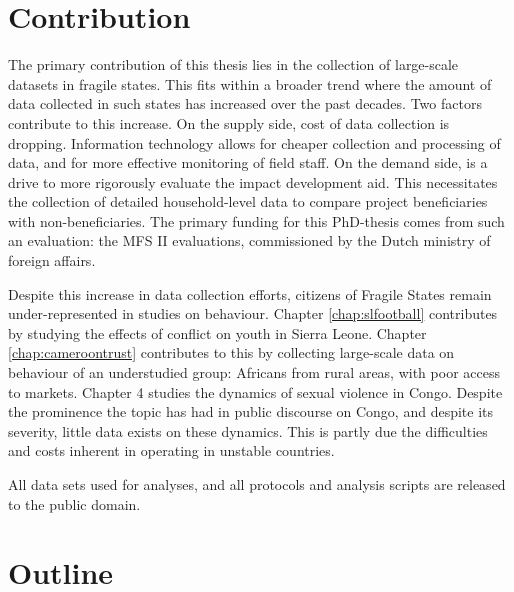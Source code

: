 \section{Contribution}
The primary contribution of this thesis lies in the collection of large-scale datasets in fragile states. This fits within a broader trend where the amount of data collected in such states has increased over the past decades. Two factors contribute to this increase. On the supply side, cost of data collection is dropping. Information technology allows for cheaper collection and processing of data, and for more effective monitoring of field staff. On the demand side, is a drive to more rigorously evaluate the impact development aid. This necessitates the collection of detailed household-level data to compare project beneficiaries with non-beneficiaries. The primary funding for this PhD-thesis comes from such an evaluation: the MFS II evaluations, commissioned by the Dutch ministry of foreign affairs.

Despite this increase in data collection efforts, citizens of Fragile States remain under-represented in studies on behaviour. Chapter \ref{chap:slfootball} contributes by studying the effects of conflict on youth in Sierra Leone. Chapter \ref{chap:cameroontrust} contributes to this by collecting large-scale data on behaviour of an understudied group: Africans from rural areas, with poor access to markets. Chapter 4 studies the dynamics of sexual violence in Congo. Despite the prominence the topic has had in public discourse on Congo, and despite its severity, little data exists on these dynamics. This is partly due the difficulties and costs inherent in operating in unstable countries.

All data sets used for analyses, and all protocols and analysis scripts are released to the public domain.


\section{Outline}


\clearpage 

